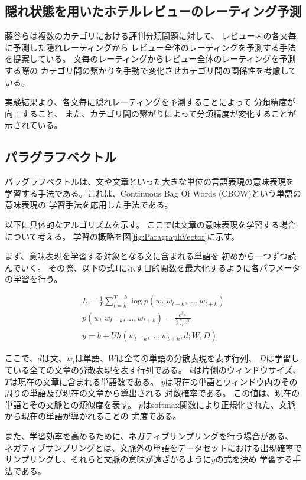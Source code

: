 \documentclass{ttithesis}
\begin{document}
\subsection{隠れ状態を用いたホテルレビューのレーティング予測}

藤谷ら\cite{fujitani15}は複数のカテゴリにおける評判分類問題に対して、
レビュー内の各文毎に予測した隠れレーティングから
レビュー全体のレーティングを予測する手法を提案している。
文毎のレーティングからレビュー全体のレーティングを予測する際の
カテゴリ間の繋がりを手動で変化させカテゴリ間の関係性を考慮している。

実験結果より、各文毎に隠れレーティングを予測することによって
分類精度が向上すること、
また、カテゴリ間の繋がりによって分類精度が変化することが示されている。


\subsection{パラグラフベクトル}

パラグラフベクトルは、文や文章といった大きな単位の言語表現の意味表現を
学習する手法である。これは、Continuous Bag Of Words
(CBOW)という単語の意味表現の 学習手法を応用した手法である。

以下に具体的なアルゴリズムを示す。
ここでは文章の意味表現を学習する場合について考える。
学習の概略を図\ref{fig:ParagraphVector}に示す。

まず、意味表現を学習する対象となる文に含まれる単語を
初めから一つずつ読んでいく。
その際、以下の式1に示す目的関数を最大化するように各パラメータの学習を行う。

\begin{gather}
  L = \frac{1}{T} \sum^{T - k}_{t = k} \log p(w_t | w_{t-k}, ..., w_{t+k}) \\
  p(w_t | w_{t-k}, ..., w_{t+k}) = \frac{e^{y_{w_t}}}{\sum_i e^{y_i}} \\
  y = b + Uh(w_{t-k}, ..., w_{t+k}, d; W, D)
\end{gather}

ここで、$d$は文、$w_i$は単語、$W$は全ての単語の分散表現を表す行列、
$D$は学習している全ての文章の分散表現を表す行列である。
$k$は片側のウィンドウサイズ、
$T$は現在の文章に含まれる単語数である。
$y$は現在の単語とウィンドウ内のその周りの単語及び現在の文章から導出される
対数確率である。 この値は、現在の単語とその文脈との類似度を表す。
$p$はsoftmax関数により正規化された、文脈から現在の単語が導かれることの
尤度である。

また、学習効率を高めるために、ネガティブサンプリングを行う場合がある、
ネガティブサンプリングとは、文脈外の単語をデータセットにおける出現確率で
サンプリングし、それらと文脈の意味が遠ざかるように$y$の式を決め
学習する手法である。
\end{document}
